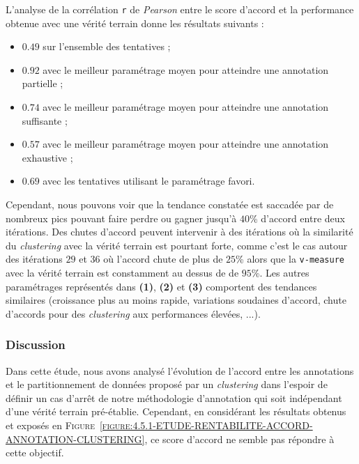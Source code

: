 			L'analyse de la corrélation \texttt{r} de \textit{Pearson} entre le score d'accord et la performance obtenue avec une vérité terrain donne les résultats suivants :
			\begin{itemize}
				\item $0.49$ sur l’ensemble des tentatives ;
				\item $0.92$ avec le meilleur paramétrage moyen pour atteindre une annotation partielle ;
				\item $0.74$ avec le meilleur paramétrage moyen pour atteindre une annotation suffisante ;
				\item $0.57$ avec le meilleur paramétrage moyen pour atteindre une annotation exhaustive ;
				\item $0.69$ avec les tentatives utilisant le paramétrage favori.
			\end{itemize}
			
			Cependant, nous pouvons voir que la tendance constatée est saccadée par de nombreux pics pouvant faire perdre ou gagner jusqu'à $40$\% d'accord entre deux itérations.
			Des chutes d'accord peuvent intervenir à des itérations où la similarité du \textit{clustering} avec la vérité terrain est pourtant forte, comme c'est le cas autour des itérations $29$ et $36$ où l'accord chute de plus de $25$\% alors que la \texttt{v-measure} avec la vérité terrain est constamment au dessus de de $95$\%.
			Les autres paramétrages représentés dans \textbf{(1)}, \textbf{(2)} et \textbf{(3)} comportent des tendances similaires (croissance plus au moins rapide, variations soudaines d'accord, chute d'accords pour des \textit{clustering} aux performances élevées, ...).

		\subsubsection{Discussion}
		
			Dans cette étude, nous avons analysé l'évolution de l'accord entre les annotations et le partitionnement de données proposé par un \textit{clustering} dans l'espoir de définir un cas d'arrêt de notre méthodologie d'annotation qui soit indépendant d'une vérité terrain pré-établie.
			Cependant, en considérant les résultats obtenus et exposés en \textsc{Figure~\ref{figure:4.5.1-ETUDE-RENTABILITE-ACCORD-ANNOTATION-CLUSTERING}}, ce score d'accord ne semble pas répondre à cette objectif.
			

